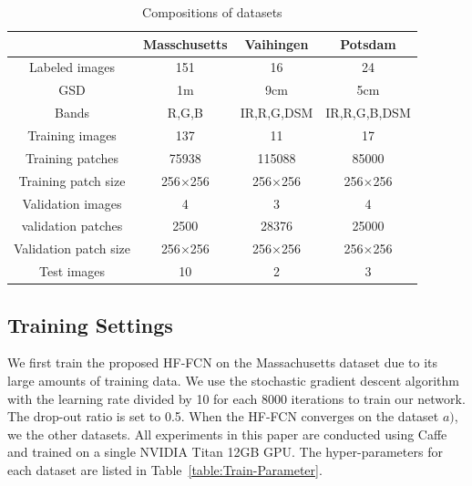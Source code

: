 \begin{table}
\setlength{\belowcaptionskip}{-2cm}
 \centering
 \caption{Compositions of datasets}
 \label{table:dataset-composition}
 \begin{tabular}{c|ccc}
\hline
& Masschusetts & Vaihingen & Potsdam\\  \hline
Labeled images & 151& 16 &24\\ \hline
GSD & 1m & 9cm & 5cm\\ \hline
Bands & R,G,B & IR,R,G,DSM & IR,R,G,B,DSM\\ \hline
Training images &137 & 11 & 17\\ \hline
Training patches&75938 &115088 &85000\\ \hline
Training patch size& 256$\times$256 & 256$\times$256 & 256$\times$256\\ \hline
Validation images & 4 & 3 & 4\\ \hline
validation patches &2500 & 28376 &25000 \\\hline
Validation patch size & 256$\times$256 & 256$\times$256 & 256$\times$256\\ \hline
Test images & 10 & 2 & 3\\ \hline
\end{tabular}
\end {table}



\subsection{Training Settings}
We first train the proposed HF-FCN on the Massachusetts dataset due to its large amounts of training data.  
%
We use the stochastic gradient descent algorithm with the learning rate divided by 10 for each 8000 iterations to train our network.
%
The drop-out ratio is set to 0.5.
%
When the HF-FCN converges on the dataset ${a)}$, we  the other datasets. 
%
All experiments in this paper are conducted using Caffe and trained on a single NVIDIA Titan 12GB GPU.
The hyper-parameters for each dataset are listed in Table~\ref{table:Train-Parameter}.

